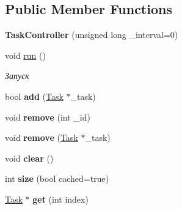 \subsection*{Public Member Functions}
\begin{DoxyCompactItemize}
\item 
\hypertarget{class_task_controller_a3cea75177e2c07bad0dbf79a4793726d}{{\bfseries Task\-Controller} (unsigned long \-\_\-interval=0)}\label{class_task_controller_a3cea75177e2c07bad0dbf79a4793726d}

\item 
\hypertarget{class_task_controller_a01759c6551d766681a93675d56cc2143}{void \hyperlink{class_task_controller_a01759c6551d766681a93675d56cc2143}{run} ()}\label{class_task_controller_a01759c6551d766681a93675d56cc2143}

\begin{DoxyCompactList}\small\item\em Запуск \end{DoxyCompactList}\item 
\hypertarget{class_task_controller_a545d27e2b7cc5e2e278a65433b23e01f}{bool {\bfseries add} (\hyperlink{class_task}{Task} $\ast$\-\_\-task)}\label{class_task_controller_a545d27e2b7cc5e2e278a65433b23e01f}

\item 
\hypertarget{class_task_controller_a7b555cbfc6cca05a0920457a53e995f0}{void {\bfseries remove} (int \-\_\-id)}\label{class_task_controller_a7b555cbfc6cca05a0920457a53e995f0}

\item 
\hypertarget{class_task_controller_a2878a0cc0f8bdefb0317839464dbd9da}{void {\bfseries remove} (\hyperlink{class_task}{Task} $\ast$\-\_\-task)}\label{class_task_controller_a2878a0cc0f8bdefb0317839464dbd9da}

\item 
\hypertarget{class_task_controller_a45ef81f85f0bdc6d2ea6473bd1cf61b6}{void {\bfseries clear} ()}\label{class_task_controller_a45ef81f85f0bdc6d2ea6473bd1cf61b6}

\item 
\hypertarget{class_task_controller_ae48409ca7b0a79efba647e8e816c11ed}{int {\bfseries size} (bool cached=true)}\label{class_task_controller_ae48409ca7b0a79efba647e8e816c11ed}

\item 
\hypertarget{class_task_controller_ad9a73b07f44fdbbb79c6e11619f2968f}{\hyperlink{class_task}{Task} $\ast$ {\bfseries get} (int index)}\label{class_task_controller_ad9a73b07f44fdbbb79c6e11619f2968f}

\end{DoxyCompactItemize}
